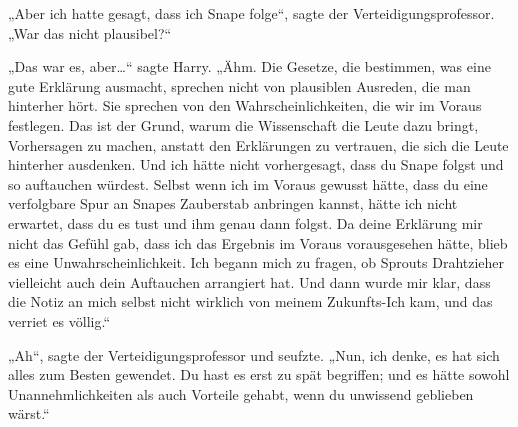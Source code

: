 „Aber ich hatte gesagt, dass ich Snape folge“, sagte der Verteidigungsprofessor. „War das nicht plausibel?“

„Das war es, aber…“ sagte Harry. „Ähm. Die Gesetze, die bestimmen, was eine gute Erklärung ausmacht, sprechen nicht von plausiblen Ausreden, die man hinterher hört. Sie sprechen von den Wahrscheinlichkeiten, die wir im Voraus festlegen. Das ist der Grund, warum die Wissenschaft die Leute dazu bringt, Vorhersagen zu machen, anstatt den Erklärungen zu vertrauen, die sich die Leute hinterher ausdenken. Und ich hätte nicht vorhergesagt, dass du Snape folgst und so auftauchen würdest. Selbst wenn ich im Voraus gewusst hätte, dass du eine verfolgbare Spur an Snapes Zauberstab anbringen kannst, hätte ich nicht erwartet, dass du es tust und ihm genau dann folgst. Da deine Erklärung mir nicht das Gefühl gab, dass ich das Ergebnis im Voraus vorausgesehen hätte, blieb es eine Unwahrscheinlichkeit. Ich begann mich zu fragen, ob Sprouts Drahtzieher vielleicht auch dein Auftauchen arrangiert hat. Und dann wurde mir klar, dass die Notiz an mich selbst nicht wirklich von meinem Zukunfts-Ich kam, und das verriet es völlig.“

„Ah“, sagte der Verteidigungsprofessor und seufzte.
„Nun, ich denke, es hat sich alles zum Besten gewendet. Du hast es erst zu spät begriffen; und es hätte sowohl Unannehmlichkeiten als auch Vorteile gehabt, wenn du unwissend geblieben wärst.“

